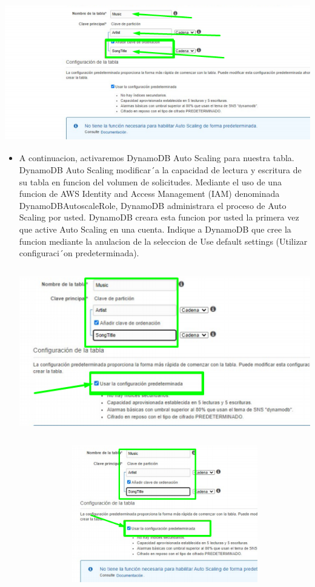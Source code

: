 \documentclass[12pt,a4paper,oneside]{book}
\begin{document}
\begin{itemize}
		\includegraphics[width=16cm, height=6cm]{img/5.png}\\
		
	\end{itemize}


	\newpage
\begin{itemize}
	\item {A continuacion, activaremos DynamoDB Auto Scaling para nuestra tabla.
		DynamoDB Auto Scaling modificar´a la capacidad de lectura y escritura de su tabla en funcion del volumen de solicitudes. Mediante el uso de una funcion de AWS Identity and Access Management (IAM) denominada DynamoDBAutoscaleRole, DynamoDB administrara el proceso de Auto Scaling por usted. DynamoDB creara esta funcion por usted la primera vez que active Auto Scaling en una cuenta.
		Indique a DynamoDB que cree la funcion mediante la anulacion de la seleccion de Use default settings (Utilizar configuraci´on predeterminada).}\\
	
	\includegraphics[width=16cm, height=8cm]{img/6.png}\\
	

	
	\includegraphics[width=16cm, height=6cm]{img/7.png}\\
	

\end{itemize}
\end{document}
